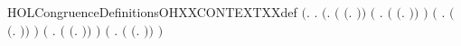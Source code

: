 \newcommand{\HOLCongruenceDefinitionsISXXCONSTXXdef}{\UseVerbatim{HOLCongruenceDefinitionsISXXCONSTXXdef}}
\begin{SaveVerbatim}{HOLCongruenceDefinitionsOHXXCONTEXTXXdef}
\HOLTokenTurnstile{}  \HOLSymConst{\ensuremath{=}}
   \ensuremath{(}\HOLTokenLambda{}.
        \HOLSymConst{\HOLTokenForall{}}.
            \ensuremath{(}\HOLSymConst{\HOLTokenForall{}}.
                 \ensuremath{(} \HOLSymConst{\ensuremath{=}} \ensuremath{(}\HOLTokenLambda{}. \ensuremath{)}\ensuremath{)} \HOLSymConst{\HOLTokenDisj{}}
                 \ensuremath{(}\HOLSymConst{\HOLTokenExists{}} . \ensuremath{(} \HOLSymConst{\ensuremath{=}} \ensuremath{(}\HOLTokenLambda{}. \HOLSymConst{\ensuremath{\ldotp}} \ensuremath{)}\ensuremath{)} \HOLSymConst{\HOLTokenConj{}}  \ensuremath{)} \HOLSymConst{\HOLTokenDisj{}}
                 \ensuremath{(}\HOLSymConst{\HOLTokenExists{}} . \ensuremath{(} \HOLSymConst{\ensuremath{=}} \ensuremath{(}\HOLTokenLambda{}.   \HOLSymConst{\ensuremath{+}} \ensuremath{)}\ensuremath{)} \HOLSymConst{\HOLTokenConj{}}  \ensuremath{)} \HOLSymConst{\HOLTokenDisj{}}
                 \ensuremath{(}\HOLSymConst{\HOLTokenExists{}} . \ensuremath{(} \HOLSymConst{\ensuremath{=}} \ensuremath{(}\HOLTokenLambda{}.  \HOLSymConst{\ensuremath{+}}  \ensuremath{)}\ensuremath{)} \HOLSymConst{\HOLTokenConj{}}  \ensuremath{)} \HOLSymConst{\HOLTokenDisj{}}
                 \ensuremath{(}\HOLSymConst{\HOLTokenExists{}} . \ensuremath{(} \HOLSymConst{\ensuremath{=}} \ensuremath{(}\HOLTokenLambda{}.   \HOLSymConst{\ensuremath{\mid}} \ensuremath{)}\ensuremath{)} \HOLSymConst{\HOLTokenConj{}}  \ensuremath{)} \HOLSymConst{\HOLTokenDisj{}}

\end{SaveVerbatim}
